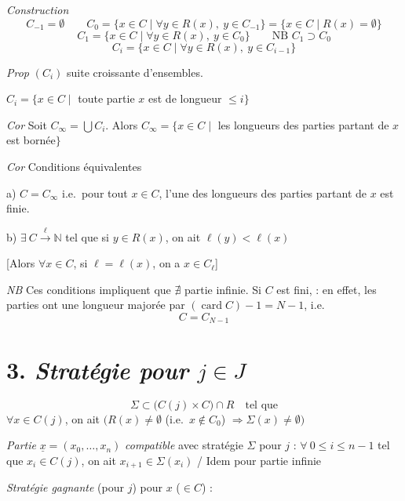 \documentclass[11pt,a4paper]{article}
\begin{document}
\emph{Construction }
\[
  C_{-1}=\emptyset \qquad C_0=\{x\in C\mid \forall y\in R(x),\ y\in C_{-1}\}=\{x\in C\mid R(x)=\emptyset\}
\]
\[
  C_1=\{x\in C\mid \forall y\in R(x),\ y\in C_0\} \qquad \text{NB } C_1\supset C_0
\]
\[
  C_i=\{x\in C\mid \forall y\in R(x),\ y\in C_{i-1}\}
\]

\emph{Prop} $(C_i)$ suite croissante d'ensembles.

$C_i=\{x\in C\mid$ toute partie \struck{\ill{}}  $x$ est de longueur $\leqslant i\}$

\emph{Cor} Soit $C_\infty=\bigcup C_i$. Alors $C_\infty=\{x\in C\mid$  les longueurs des parties partant de $x$ est bornée$\}$

\emph{Cor} Conditions équivalentes

a) $C=C_\infty$ i.e.\ pour tout $x\in C$, l'une des longueurs des parties partant de $x$ est finie.

b) $\exists\ C\xrightarrow{\ \ell\ }\mathbb{N}$ tel que si $y\in R(x)$, on ait $\ell(y)<\ell(x)$

[Alors $\forall x\in C$, si $\ell=\ell(x)$, on a $x\in C_\ell$]


\emph{NB} Ces conditions impliquent que $\nexists$ partie infinie.
 Si $C$ est fini, \struck{\ill{}}  : en effet, les parties \struck{\ill{}} ont une longueur majorée par $(\operatorname{card}C)-1=N-1$, i.e.
\[
  C=C_{N-1}
\]


\section*{3. \emph{Stratégie pour $j\in J$}}

\[
  \Sigma\subset\bigl(C(j)\times C\bigr)\cap R \quad\text{tel que}
\]
$\forall x\in C(j)$, on ait $\bigl(R(x)\neq\emptyset$ (i.e.\ $x\notin C_0$) $\Longrightarrow\Sigma(x)\neq\emptyset\bigr)$

\emph{Partie} $\underline{x}=(x_0,\ldots,x_n)$ \emph{compatible} avec stratégie $\Sigma$ pour $j$ : $\forall\ 0\leqslant i\leqslant n-1$ tel que $x_i\in C(j)$, on ait $x_{i+1}\in\Sigma(x_i)$ / Idem pour partie infinie

\emph{Stratégie gagnante} (pour $j$) pour $x$ ($\in C$) :
\end{document}
